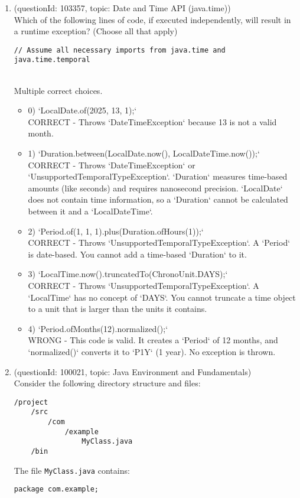\documentclass[12pt]{article}
\begin{document}
\begin{enumerate}[label=(\arabic*)]
\begin{itemize}
\end{itemize}
\item (questionId: 103357, topic: Date and Time API (java.time)) \\ 
Which of the following lines of code, if executed independently, will result in a runtime exception? (Choose all that apply)
\begin{verbatim}
// Assume all necessary imports from java.time and java.time.temporal
\end{verbatim}
\\ \noindent Multiple correct choices. 
\begin{itemize}
\item 0) `LocalDate.of(2025, 13, 1);`
 \\ 
CORRECT - Throws `DateTimeException` because 13 is not a valid month.

\item 1) `Duration.between(LocalDate.now(), LocalDateTime.now());`
 \\ 
CORRECT - Throws `DateTimeException` or `UnsupportedTemporalTypeException`. `Duration` measures time-based amounts (like seconds) and requires nanosecond precision. `LocalDate` does not contain time information, so a `Duration` cannot be calculated between it and a `LocalDateTime`.

\item 2) `Period.of(1, 1, 1).plus(Duration.ofHours(1));`
 \\ 
CORRECT - Throws `UnsupportedTemporalTypeException`. A `Period` is date-based. You cannot add a time-based `Duration` to it.

\item 3) `LocalTime.now().truncatedTo(ChronoUnit.DAYS);`
 \\ 
CORRECT - Throws `UnsupportedTemporalTypeException`. A `LocalTime` has no concept of `DAYS`. You cannot truncate a time object to a unit that is larger than the units it contains.

\item 4) `Period.ofMonths(12).normalized();`
 \\ 
WRONG - This code is valid. It creates a `Period` of 12 months, and `normalized()` converts it to `P1Y` (1 year). No exception is thrown.

\end{itemize}
\item (questionId: 100021, topic: Java Environment and Fundamentals) \\ 
Consider the following directory structure and files:
\begin{verbatim}
/project
    /src
        /com
            /example
                MyClass.java
    /bin
\end{verbatim}
The file \verb|MyClass.java| contains:
\begin{verbatim}
package com.example;


\end{verbatim}
\end{enumerate}
\end{document}
